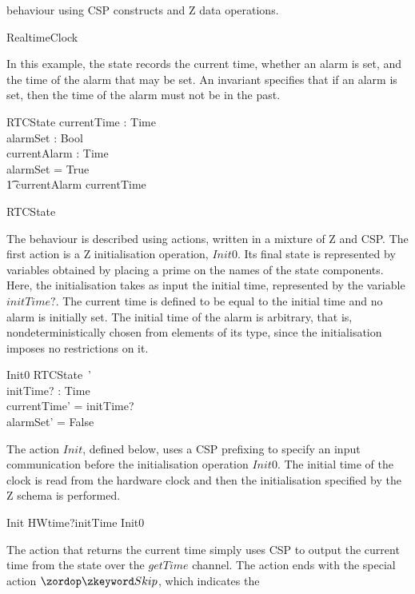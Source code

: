\documentclass[a4paper,10pt]{report}
\begin{document}
behaviour using CSP constructs and Z data operations.
%
\begin{circus}
  \circprocess RealtimeClock \circdef \circbegin
\end{circus}
%
In this example, the state records the current time, whether an alarm
is set, and the time of the alarm that may be set.
An invariant specifies that if an alarm is set, then the time of the
alarm must not be in the past.
%
\begin{schema}{RTCState}
  currentTime  : Time \\
  alarmSet     : Bool \\
  currentAlarm : Time \\
  \where
  alarmSet = True \implies \\
  \t1 currentAlarm \geq currentTime
\end{schema}
\begin{circusaction}
  \circstate RTCState
\end{circusaction}
%
The behaviour is described using actions, written in a mixture of Z
and CSP.
The first action is a Z initialisation operation, $Init0$.
Its final state is represented by variables obtained by placing a
prime on the names of the state components.
Here, the initialisation takes as input the initial time, represented
by the variable $initTime?$.
The current time is defined to be equal to the initial time and no
alarm is initially set.
The initial time of the alarm is arbitrary, that is,
nondeterministically chosen from elements of its type, since the
initialisation imposes no restrictions on it.
%
\begin{schema}{Init0}
  RTCState~' \\
  initTime?
  : Time \\
  \where currentTime' = initTime?
  \\
  alarmSet' = False \\
\end{schema}
%
The action $Init$, defined below, uses a CSP prefixing to specify an
input communication before the initialisation operation $Init0$.
The initial time of the clock is read from the hardware clock and then
the initialisation specified by the Z schema is performed.
%
\begin{circusaction}
  Init \circdef HWtime?initTime \then Init0
\end{circusaction}
%
The action that returns the current time simply uses CSP to output the
current time from the state over the $getTime$ channel.
The action ends with the special action $\Skip$, which indicates the
\end{document}
